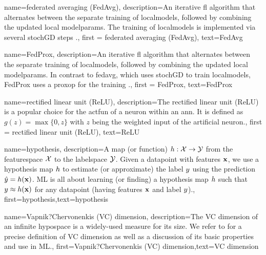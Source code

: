 {name={federated averaging (FedAvg)},
	description={An iterative \gls{fl} 
		algorithm that alternates between the separate training of \gls{localmodel}s, followed by 
		combining the updated local \gls{modelparams}. The training of \gls{localmodel}s 
		is implemented via several \gls{stochGD} steps \cite{pmlr-v54-mcmahan17a}.}, 
		first = {federated averaging (FedAvg)}, text={FedAvg} 
}

{name={FedProx},
	description={An iterative \gls{fl} 
		algorithm that alternates between the separate training of \gls{localmodel}s, followed by 
		combining the updated local \gls{modelparams}. In contrast to \gls{fedavg}, which uses 
		\gls{stochGD} to train \gls{localmodel}s, FedProx uses a \gls{proxop} for the training \cite{FedProx2020}.}, 
	first = {FedProx}, text={FedProx} 
}

{name={rectified linear unit (ReLU)},
	description={The rectified linear unit (ReLU) is 
		a popular choice for the \gls{actfun} of a neuron within an \gls{ann}. It is defined 
		as $g(z) = \max\{0,z\}$ with $z$ being the weighted input of the artificial neuron.}, first = {rectified linear unit (ReLU)}, text={ReLU} 
}

{name={hypothesis},
	description={A map (or function) $h: \mathcal{X} \rightarrow \mathcal{Y}$ from the 
		\gls{featurespace} $\mathcal{X}$ to the \gls{labelspace} $\mathcal{Y}$. 
		Given a \gls{datapoint} with \gls{feature}s ${\bf x}$, we use a hypothesis map $h$
		to estimate (or approximate) the \gls{label} $y$ using the \gls{prediction}  
		$\hat{y} = h({\bf x})$. ML is all about learning (or finding) a 
		hypothesis map $h$ such that $y \approx h({\bf x})$ 
		for any \gls{datapoint} (having \gls{feature}s ${\bf x}$ and \gls{label} $y$).},
	first={hypothesis},text={hypothesis}  
}



{name={Vapnik?Chervonenkis (VC) dimension},
	description={The VC dimension of an infinite \gls{hypospace} is a widely-used measure 
		for its size. We refer to \cite{ShalevMLBook} for a precise definition of VC dimension 
		as well as a discussion of its basic properties and use in ML.},
	first={Vapnik?Chervonenkis (VC) dimension},text={VC dimension}  
}


